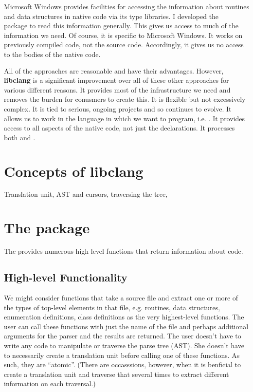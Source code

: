 \documentclass[article]{jss}
\def\C{\proglang{C}}
\def\Cpp{\proglang{C$++$}}
\def\R{\proglang{R}}
\def\Rpkg#1{\pkg{#1}}
\def\libclang{\textbf{libclang}}
\begin{document}
Microsoft Windows provides facilities for accessing the information
about routines and data structures in native code via its type
libraries.  I developed the
\Rpkg{SWinTypeLibs}~\cite{bib:SWinTypeLibs} package to read this
information generally. This gives us access to much of the information
we need. Of course, it is specific to Microsoft Windows. It works on
previously compiled code, not the source code.  Accordingly, it gives
us no access to the bodies of the native code.



All of the approaches are reasonable and have their
advantages. However, \libclang{} is a significant improvement over all
of these other approaches for various different reasons. It provides
most of the infrastructure we need and removes the burden for
conusmers to create this.  It is flexible but not excessively complex.
It is tied to serious, ongoing projects and so continues to evolve. It
allows us to work in the language in which we want to program,
i.e. \R.  It provides access to all aspects of the native code, not
just the declarations. It processes both \C{} and \Cpp.


\section[Concepts of libclang]{Concepts of \libclang}\label{sec:libclangConcepts}

Translation unit,  AST and cursors, traversing the tree, 

\section[The RCIndex package]{The \Rpkg{RCIndex} package}\label{sec:RCIndex}
The \Rpkg{RCIndex} provides numerous high-level functions that return
information about \C{} code.

\subsection{High-level Functionality}



We might consider functions that take a source file and extract one or
more of the types of top-level elements in that file, e.g. routines,
data structures, enumeration definitions, \Cpp{} class definitions as
the very highest-level functions.  The \R{} user can call these
functions with just the name of the file and perhaps additional
arguments for the parser and the results are returned.  The user
doesn't have to write any code to manipulate or traverse the parse
tree (AST).  She doesn't have to necessarily create a translation unit
before calling one of these functions. As such, they are ``atomic''.
(There are occasssions, however, when it is benficial to create a
translation unit and traverse that several times to extract different
information on each traversal.)
\end{document}
